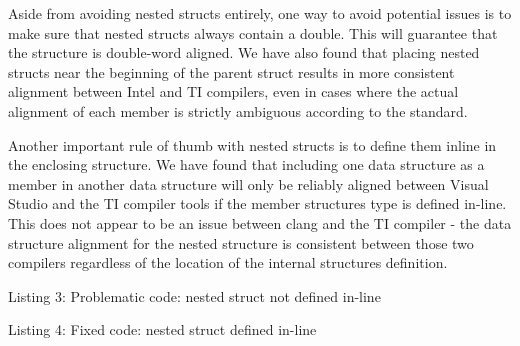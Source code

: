 Aside from avoiding nested structs entirely, one way to avoid potential issues is to make sure that nested structs always contain a double. This will guarantee that the structure is double-\/word aligned. We have also found that placing nested structs near the beginning of the parent struct results in more consistent alignment between Intel and TI compilers, even in cases where the actual alignment of each member is strictly ambiguous according to the standard.

Another important rule of thumb with nested structs is to define them inline in the enclosing structure. We have found that including one data structure as a member in another data structure will only be reliably aligned between Visual Studio and the TI compiler tools if the member structure\textquotesingle{}s type is defined in-\/line. This does not appear to be an issue between clang and the TI compiler -\/ the data structure alignment for the nested structure is consistent between those two compilers regardless of the location of the internal structure\textquotesingle{}s definition.


\begin{DoxyCode}{0}
\DoxyCodeLine{\textcolor{preprocessor}{\#include AAX\_ALIGN\_FILE\_ALG}}
\DoxyCodeLine{\{}
\DoxyCodeLine{\};}
\DoxyCodeLine{\textcolor{preprocessor}{\#include AAX\_ALIGN\_FILE\_RESET}}
\DoxyCodeLine{}
\DoxyCodeLine{\textcolor{comment}{// Somewhere else...}}
\DoxyCodeLine{\textcolor{preprocessor}{\#include AAX\_ALIGN\_FILE\_ALG}}
\DoxyCodeLine{\{}
\DoxyCodeLine{\textcolor{keyword}{public}:}
\DoxyCodeLine{}
\DoxyCodeLine{   \textcolor{comment}{// other stuff...}}
\DoxyCodeLine{\};}
\DoxyCodeLine{\textcolor{preprocessor}{\#include AAX\_ALIGN\_FILE\_RESET}}
\end{DoxyCode}
  Listing 3\+: Problematic code\+: nested struct not defined in-\/line


\begin{DoxyCode}{0}
\DoxyCodeLine{\textcolor{preprocessor}{\#include AAX\_ALIGN\_FILE\_ALG}}
\DoxyCodeLine{\{}
\DoxyCodeLine{\textcolor{keyword}{public}:}
\DoxyCodeLine{   \{}
\DoxyCodeLine{}
\DoxyCodeLine{   \textcolor{comment}{// other stuff...}}
\DoxyCodeLine{\};}
\DoxyCodeLine{\textcolor{preprocessor}{\#include AAX\_ALIGN\_FILE\_RESET}}
\end{DoxyCode}
  Listing 4\+: Fixed code\+: nested struct defined in-\/line

